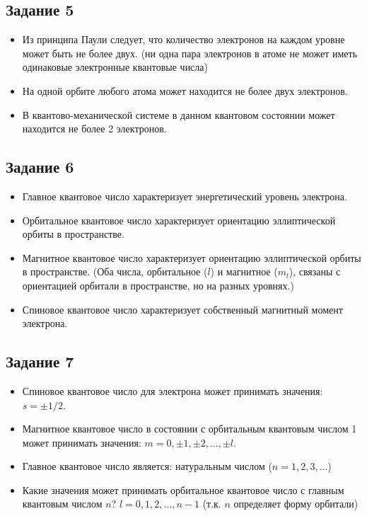 \documentclass[../main.tex]{subfiles}
\begin{document}
\subsection{Задание 5}
\begin{itemize}
    \item Из принципа Паули следует, что количество электронов на каждом уровне может быть не более двух. (ни одна пара электронов в атоме не может иметь одинаковые электронные квантовые числа)
    \item На одной орбите любого атома может находится не более двух электронов.
    \item В квантово-механической системе в данном квантовом состоянии может находится не более 2 электронов.
\end{itemize}

\subsection{Задание 6}
\begin{itemize}
    \item Главное квантовое число характеризует энергетический уровень электрона.
    \item Орбитальное квантовое число характеризует ориентацию эллиптической орбиты в пространстве.
    \item Магнитное квантовое число характеризует ориентацию эллиптической орбиты в пространстве. (Оба числа, орбитальное ($l$) и магнитное ($m_l$), связаны с ориентацией орбитали в пространстве, но на разных уровнях.)
    \item Спиновое квантовое число характеризует собственный магнитный момент электрона.
\end{itemize}

\subsection{Задание 7}
\begin{itemize}
    \item Спиновое квантовое число для электрона может принимать значения: $s = \pm 1/2$.
    \item Магнитное квантовое число в состоянии с орбитальным квантовым числом 1 может принимать значения: $m = 0, \pm1, \pm2, \dots, \pm l$.
    \item Главное квантовое число является: натуральным числом ($n = 1, 2, 3, \dots$)
    \item Какие значения может принимать орбитальное квантовое число с главным квантовым числом $n$? $l = 0, 1, 2, \dots, n-1$ (т.к. $n$ определяет форму орбитали)
\end{itemize}
\end{document}
